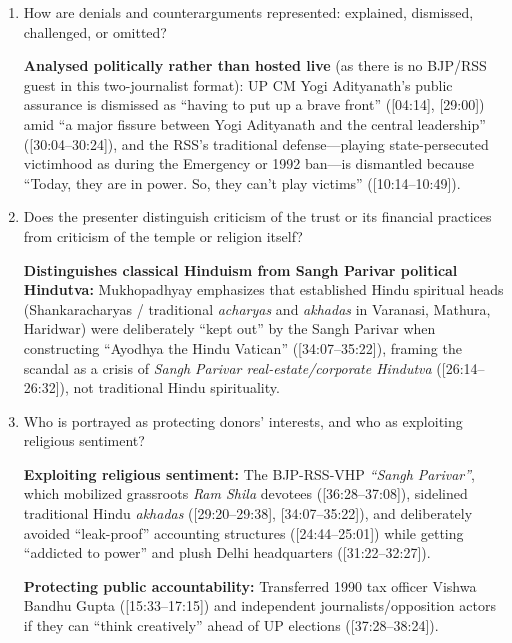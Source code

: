 \documentclass[10pt,a4paper]{article}
\begin{document}
\begin{enumerate}[leftmargin=1.5em, itemsep=6pt, topsep=4pt]
  \item How are denials and counterarguments represented: explained, dismissed, challenged, or omitted?\par\smallskip
  \textbf{Analysed politically rather than hosted live} (as there is no BJP/RSS guest in this two-journalist format): UP CM Yogi Adityanath's public assurance is dismissed as ``having to put up a brave front'' ([04:14], [29:00]) amid ``a major fissure between Yogi Adityanath and the central leadership'' ([30:04--30:24]), and the RSS's traditional defense---playing state-persecuted victimhood as during the Emergency or 1992 ban---is dismantled because ``Today, they are in power. So, they can't play victims'' ([10:14--10:49]).
  \item Does the presenter distinguish criticism of the trust or its financial practices from criticism of the temple or religion itself?\par\smallskip
  \textbf{Distinguishes classical Hinduism from Sangh Parivar political Hindutva:} Mukhopadhyay emphasizes that established Hindu spiritual heads (Shankaracharyas / traditional \emph{acharyas} and \emph{akhadas} in Varanasi, Mathura, Haridwar) were deliberately ``kept out'' by the Sangh Parivar when constructing ``Ayodhya the Hindu Vatican'' ([34:07--35:22]), framing the scandal as a crisis of \emph{Sangh Parivar real-estate/corporate Hindutva} ([26:14--26:32]), not traditional Hindu spirituality.
  \item Who is portrayed as protecting donors' interests, and who as exploiting religious sentiment?\par\smallskip
  \textbf{Exploiting religious sentiment:} The BJP-RSS-VHP \emph{``Sangh Parivar''}, which mobilized grassroots \emph{Ram Shila} devotees ([36:28--37:08]), sidelined traditional Hindu \emph{akhadas} ([29:20--29:38], [34:07--35:22]), and deliberately avoided ``leak-proof'' accounting structures ([24:44--25:01]) while getting ``addicted to power'' and plush Delhi headquarters ([31:22--32:27]).

  \textbf{Protecting public accountability:} Transferred 1990 tax officer Vishwa Bandhu Gupta ([15:33--17:15]) and independent journalists/opposition actors if they can ``think creatively'' ahead of UP elections ([37:28--38:24]).
\end{enumerate}
\end{document}
